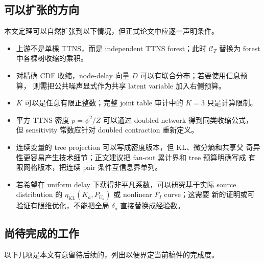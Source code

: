 \documentclass[a4paper,11pt]{article}
\theoremstyle{definition}
\newcommand{\1}{\mathbf 1}
\newcommand{\KL}{\mathrm{KL}}
\begin{document}
\subsection{可以扩张的方向}

本文定理可以自然扩张到以下情况，但正式论文中应逐一声明条件。

\begin{itemize}
\item 上游不是单棵 TTNS，而是 independent TTNS forest；此时 $\mathcal C_T$
替换为 forest 中各棵树收缩的乘积。
\item 对精确 CDF 收缩，node-delay 向量 $D$ 可以有联合分布；若要使用信息预算，
则需把公共噪声显式作为共享 latent variable 加入右侧预算。
\item $K$ 可以是任意有限正整数；完整 joint table 审计中的 $K=3$ 只是计算限制。
\item 平方 TTNS 密度 $p=\psi^2/Z$ 可以通过 doubled network 得到同类收缩公式，
但 sensitivity 常数应针对 doubled contraction 重新定义。
\item 连续变量的 tree projection 可以写成密度版本，但 KL、微分熵和共享父
奇异性更容易产生技术细节；正文建议把 fan-out 累计界和 tree 预算明确写成
有限网格版本，把连续 pair 条件互信息界单列。
\item 若希望在 uniform delay 下获得非平凡系数，可以研究基于实际 source
distribution 的 $\eta_{\KL}(K_a,P_{U_a})$ 或 nonlinear $F_I$ curve；这需要
新的证明或可验证有限维优化，不能把全局 $\delta_a$ 直接替换成经验数。
\end{itemize}

\subsection{尚待完成的工作}
\label{sec:todo}

以下几项是本文有意留待后续的，列出以便界定当前稿件的完成度。
\end{document}
